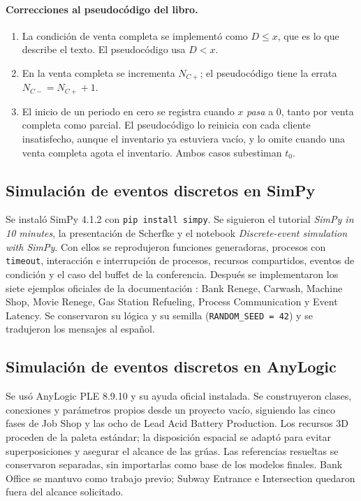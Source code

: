 \documentclass[11pt,a4paper]{article}
\begin{document}
\paragraph{Correcciones al pseudocódigo del libro.}
\begin{enumerate}[label=(\alph*)]
 \item La condición de venta completa se implementó como $D\le x$, que es lo que describe
 el texto. El pseudocódigo usa $D<x$.
 \item En la venta completa se incrementa $N_{C+}$; el pseudocódigo tiene la errata
 $N_{C-}=N_{C+}+1$.
 \item El inicio de un periodo en cero se registra cuando $x$ \emph{pasa} a 0, tanto por
 venta completa como parcial. El pseudocódigo lo reinicia con cada cliente insatisfecho,
 aunque el inventario ya estuviera vacío, y lo omite cuando una venta completa agota el
 inventario. Ambos casos subestiman $t_0$.
\end{enumerate}

\subsection{Simulación de eventos discretos en SimPy}
Se instaló SimPy 4.1.2 con \texttt{pip install simpy}. Se siguieron el tutorial
\emph{SimPy in 10 minutes}, la presentación de Scherfke \cite{scherfke2014} y el notebook
\emph{Discrete-event simulation with SimPy}. Con ellos se reprodujeron funciones generadoras,
procesos con \texttt{timeout}, interacción e interrupción de procesos, recursos compartidos,
eventos de condición y el caso del buffet de la conferencia. Después se implementaron los
siete ejemplos oficiales de la documentación \cite{simpydocs}: Bank Renege, Carwash, Machine
Shop, Movie Renege, Gas Station Refueling, Process Communication y Event Latency. Se
conservaron su lógica y su semilla (\texttt{RANDOM\_SEED = 42}) y se tradujeron los mensajes
al español.

\subsection{Simulación de eventos discretos en AnyLogic}
Se usó AnyLogic PLE 8.9.10 y su ayuda oficial instalada. Se construyeron clases,
conexiones y parámetros propios desde un proyecto vacío, siguiendo las cinco fases de
Job Shop y las ocho de Lead Acid Battery Production. Los recursos 3D proceden de la
paleta estándar; la disposición espacial se adaptó para evitar superposiciones y
asegurar el alcance de las grúas. Las referencias resueltas se conservaron separadas,
sin importarlas como base de los modelos finales. Bank Office se mantuvo como trabajo
previo; Subway Entrance e Intersection quedaron fuera del alcance solicitado.
\end{document}
